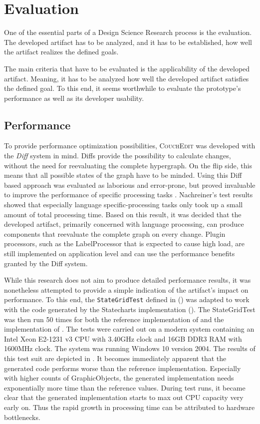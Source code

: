 \chapter{Evaluation}
\label{ch:evaluation}
One of the essential parts of a Design Science Research process is the evaluation. The developed artifact has to be analyzed, and it has to be established, how well the artifact realizes the defined goals.

The main criteria that have to be evaluated is the applicability of the developed artifact. Meaning, it has to be analyzed how well the developed artifact satisfies the defined goal. To this end, it seems worthwhile to evaluate the prototype's performance as well as its developer usability.

\section{Performance}
\label{sec:performance}
To provide performance optimization possibilities, \textsc{CouchEdit} was developed with the \emph{Diff} system in mind. Diffs provide the possibility to calculate changes, without the need for reevaluating the complete hypergraph. On the flip side, this means that all possible states of the graph have to be minded. Using this Diff based approach was evaluated as laborious and error-prone, but proved invaluable to improve the performance of specific processing tasks \cite{nachreiner_couchedit_2020}. Nachreiner's test results showed that especially language specific-processing tasks only took up a small amount of total processing time. Based on this result, it was decided that the developed artifact, primarily concerned with language processing, can produce components that reevaluate the complete graph on every change. Plugin processors, such as the LabelProcessor that is expected to cause high load, are still implemented on application level and can use the performance benefits granted by the Diff system.

While this research does not aim to produce detailed performance results, it was nonetheless attempted to provide a simple indication of the artifact's impact on performance. To this end, the \texttt{StateGridTest} defined in \cite{nachreiner_couchedit_2020} () was adapted to work with the code generated by the Statecharts implementation (). The StateGridTest was then run 50 times for both the reference implementation of \cite{nachreiner_couchedit_2020} and the implementation of . The tests were carried out on a modern system containing an Intel Xeon E2-1231 v3 CPU with 3.40GHz clock and 16GB DDR3 RAM with 1600MHz clock. The system was running Windows 10 version 2004. The results of this test suit are depicted in . It becomes immediately apparent that the generated code performs worse than the reference implementation. Especially with higher counts of GraphicObjects, the generated implementation needs exponentially more time than the reference values. During test runs, it became clear that the generated implementation starts to max out CPU capacity very early on. Thus the rapid growth in processing time can be attributed to hardware bottlenecks. 

